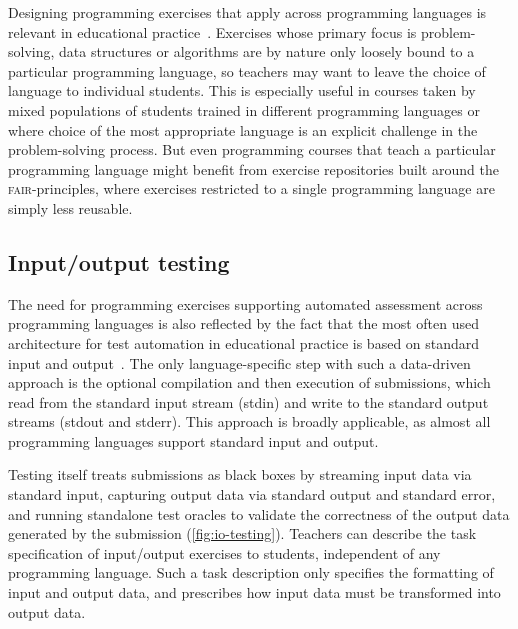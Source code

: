 \documentclass[../main]{subfiles}
\begin{document}
Designing programming exercises that apply across programming languages is relevant in educational practice~\autocite{murphyAnalysisIntroductoryProgramming2017}.
Exercises whose primary focus is problem-solving, data structures or algorithms are by nature only loosely bound to a particular programming language, so teachers may want to leave the choice of language to individual students.
This is especially useful in courses taken by mixed populations of students trained in different programming languages or where choice of the most appropriate language is an explicit challenge in the problem-solving process.
But even programming courses that teach a particular programming language might benefit from exercise repositories built around the \textsc{fair}-principles, where exercises restricted to a single programming language are simply less reusable.

\subsection{Input/output testing}\label{subsec:dsl-i/o-stream-testing}

The need for programming exercises supporting automated assessment across programming languages is also reflected by the fact that the most often used architecture for test automation in educational practice is based on standard input and output~\autocite{douceAutomaticTestbasedAssessment2005,ullahEffectAutomaticAssessment2018,wasikSurveyOnlineJudge2018}.
The only language-specific step with such a data-driven approach is the optional compilation and then execution of submissions, which read from the standard input stream (stdin) and write to the standard output streams (stdout and stderr).
This approach is broadly applicable, as almost all programming languages support standard input and output.

Testing itself treats submissions as black boxes by streaming input data via standard input, capturing output data via standard output and standard error, and running standalone test oracles to validate the correctness of the output data generated by the submission (\cref{fig:io-testing}).
Teachers can describe the task specification of input/output exercises to students, independent of any programming language.
Such a task description only specifies the formatting of input and output data, and prescribes how input data must be transformed into output data.
\end{document}
